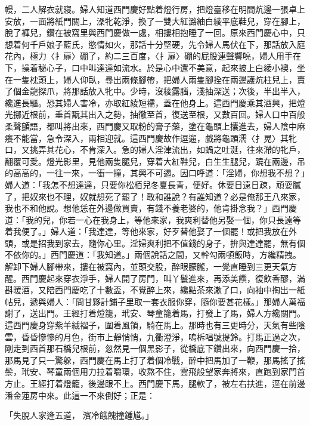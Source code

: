 \begin{showcontents}{}
幔，二人解衣就寢。婦人知道西門慶好點着燈行房，把燈臺移在明間炕邊一張卓上安放，一面將紙門關上，澡牝乾淨，換了一雙大紅潞紬白綾平底鞋兒，穿在腳上，脫了褲兒，鑽在被窩里與西門慶做一處，相摟相抱睡了一回。原來西門慶心中，只想着何千戶娘子藍氏，慾情如火，那話十分堅硬，先令婦人馬伏在下，那話放入庭花內，極力〈扌扉〉硼了，約二三百度，〈扌扉〉硼的屁股連聲響喨，婦人用手在下，操着秘心子，口中叫達達如流水。於是心中還不美意，起來披上白綾小襖，坐在一隻枕頭上，婦人仰臥，尋出兩條腳帶，把婦人兩隻腳拴在兩邊護炕柱兒上，賣了個金龍探爪，將那話放入牝中。少時，沒稜露腦，淺抽深送；次後，半出半入，纔進長驅。恐其婦人害冷，亦取紅綾短襦，蓋在他身上。這西門慶乘其酒興，把燈光挪近根前，垂首翫其出入之勢，抽徹至首，復送至根，又數百回。婦人口中百般柔聲顫語，都叫將出來，西門慶又取粉的膏子藥，塗在龜頭上攮進去，婦人陰中麻癢不能當，急令深入，兩相迎就。這西門慶故作逗遛，戲將龜頭濡〈扌晃〉其牝口，又挑弄其花心，不肯深入。急的婦人淫津流出，如蝸之吐涎，往來滯的牝戶，翻覆可愛。燈光影里，見他兩隻腿兒，穿着大紅鞋兒，白生生腿兒，蹺在兩邊，吊的高高的，一往一來，一衝一撞，其興不可遏。因口呼道：「淫婦，你想我不想？」婦人道：「我怎不想達達，只要你松栢兒冬夏長青，便好。休要日遠日疎，頑耍膩了，把奴來也不理，奴就想死了罷了！敢和誰說？有誰知道？必是俺那王八來家，我也不和他說。想他恁在外邊做買賣，有錢不養老婆的，他肯掛念我？」西門慶道：「我的兒，你若一心在我身上，等他來家，我爽利替他另娶一個，你只長遠等着我便了。」婦人道：「我達達，等他來家，好歹替他娶了一個罷！或把我放在外頭，或是招我到家去，隨你心里。淫婦爽利把不值錢的身子，拚與達達罷，無有個不依你的。」西門慶道：「我知道。」兩個說話之間，又幹勾兩頓飯時，方纔精拽。解卸下婦人腳帶來，摟在被窩內，並頭交股，醉眼朦朧，一覺直睡到三更天氣方醒。西門慶起來穿衣淨手，婦人開了房門，叫丫鬟進來，再添美饌，復飲香醪，滿斟暖酒，又陪西門慶吃了十數盃，不覺醉上來，纔點茶來漱了口，向袖中掏出一紙帖兒，遞與婦人：「問甘夥計鋪子里取一套衣服你穿，隨你要甚花樣。」那婦人萬福謝了，送出門。王經打着燈籠，玳安、琴童籠着馬，打發上了馬，婦人方纔關門。這西門慶身穿紫羊絨褶子，圍着風領，騎在馬上。那時也有三更時分，天氣有些陰雲，昏昏慘慘的月色，街巿上靜悄悄，九衢澄淨，嗚柝唱號提鈴。打馬正過之次，剛走到西首那石橋兒根前，忽然見一個黑影子，從橋底下鑽出來，向西門慶一拾，那馬見了只一驚躲，西門慶在馬上打了着個冷戰，醉中把馬加了一鞭，那馬搖了搖鬃，玳安、琴童兩個用力拉着嚼環，收熬不住，雲飛般望家奔將來，直跑到家門首方止。王經打着燈籠，後邊跟不上。西門慶下馬，腿軟了，被左右扶進，逕在前邊潘金蓮房中來。此這一不來倒好；正是：

「失脫人家逄五道，  濱冷餓餽撞鍾馗。」


\end{showcontents}
